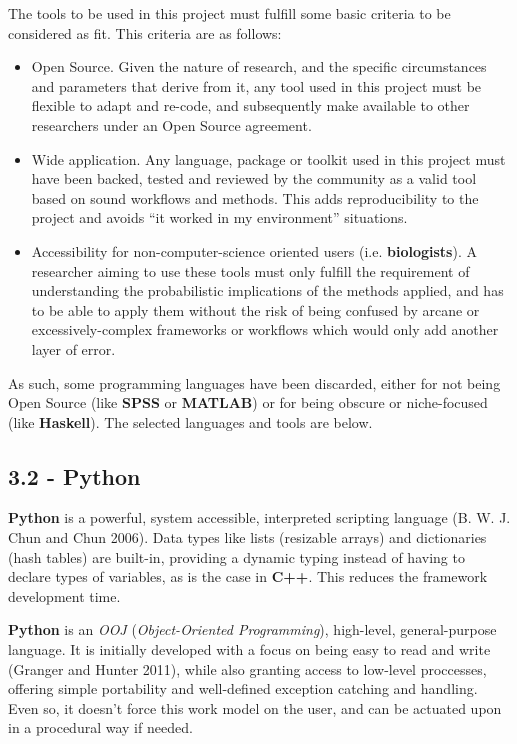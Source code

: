 \documentclass[]{article}
\begin{document}
The tools to be used in this project must fulfill some basic criteria to
be considered as fit. This criteria are as follows:

\begin{itemize}
\item
  Open Source. Given the nature of research, and the specific
  circumstances and parameters that derive from it, any tool used in
  this project must be flexible to adapt and re-code, and subsequently
  make available to other researchers under an Open Source agreement.
\item
  Wide application. Any language, package or toolkit used in this
  project must have been backed, tested and reviewed by the community as
  a valid tool based on sound workflows and methods. This adds
  reproducibility to the project and avoids ``it worked in my
  environment'' situations.
\item
  Accessibility for non-computer-science oriented users (i.e.
  \textbf{biologists}). A researcher aiming to use these tools must only
  fulfill the requirement of understanding the probabilistic
  implications of the methods applied, and has to be able to apply them
  without the risk of being confused by arcane or excessively-complex
  frameworks or workflows which would only add another layer of error.
\end{itemize}

As such, some programming languages have been discarded, either for not
being Open Source (like \textbf{SPSS} or \textbf{MATLAB}) or for being
obscure or niche-focused (like \textbf{Haskell}). The selected languages
and tools are below.

\subsection{3.2 - Python}\label{python}

\textbf{Python} is a powerful, system accessible, interpreted scripting
language (B. W. J. Chun and Chun 2006). Data types like lists (resizable
arrays) and dictionaries (hash tables) are built-in, providing a dynamic
typing instead of having to declare types of variables, as is the case
in \textbf{C++}. This reduces the framework development time.

\textbf{Python} is an \emph{OOJ} (\emph{Object-Oriented Programming}),
high-level, general-purpose language. It is initially developed with a
focus on being easy to read and write (Granger and Hunter 2011), while
also granting access to low-level proccesses, offering simple
portability and well-defined exception catching and handling. Even so,
it doesn't force this work model on the user, and can be actuated upon
in a procedural way if needed.
\end{document}
